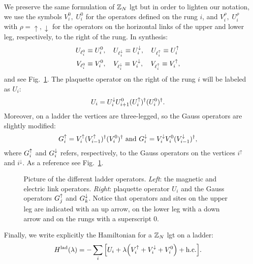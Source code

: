 We preserve the same formulation of $\Z_N$ \ac{lgt} but in order to lighten our notation,
we use the symbols $V^0_i, \; U^0_i$ for the operators defined on the rung $i$, and  $V^{\rho}_i, \; U^{\rho}_i$ with $\rho = \uparrow, \downarrow$ for the operators on the horizontal links of the upper and lower leg, respectively, to the right of the rung.
In synthesis:
\begin{equation}
    \begin{split}
        U_{\ell^0_i} & \equiv U^0_i, \quad
        U_{\ell^\downarrow_i}   \equiv U^{\downarrow}_i, \quad
        U_{\ell^\uparrow_i}   \equiv U^{\uparrow}_i \\
        V_{\ell^0_i} & \equiv V^0_i, \quad
        V_{\ell^\downarrow_i}   \equiv V^{\downarrow}_i, \quad
        V_{\ell^\uparrow_i}   \equiv V^{\uparrow}_i,
    \end{split}
\end{equation}
and see Fig.~\ref{fig:ladder_operators}.
The plaquette operator on the right of the rung $i$ will be labeled as $U_i$:
\begin{equation}
    U_i = U^{\downarrow}_i U^0_{i+1} (U^{\uparrow}_i)^{\dagger} (U^0_i)^{\dagger}.
    \label{eq:plaq_op_ladder}
\end{equation}
Moreover, on a ladder the vertices are three-legged, so the Gauss operators are slightly modified:
\begin{equation}
    G^{\uparrow}_i
    = V^{\uparrow}_i ( V^{\uparrow}_{i-1} )^\dagger ( V^0_i )^\dagger \text{~and~}
    G^{\downarrow}_i
    = V^{\downarrow}_i V^0_i ( V^{\downarrow}_{i-1} )^\dagger,
    \label{eq:gauss_law_ladder}
\end{equation}
where $G^{\uparrow}_i$ and $G^{\downarrow}_i$ refers, respectively, to the Gauss operators on the vertices $i^{\uparrow}$ and $i^{\downarrow}$.
As a reference see Fig.~\ref{fig:ladder_operators}.

\begin{figure}
    \centering
    
    \caption[Operators of a $\Z_N$ ladder \ac{lgt}]{%
        Picture of the different ladder operators.
        \emph{Left}: the magnetic and electric link operators.
        \emph{Right}: plaquette operator $U_i$ and the Gauss operators $G^{\uparrow}_j$ and $G^{\downarrow}_k$.
        Notice that operators and sites on the upper leg are indicated with an up arrow, on the lower leg with a down arrow and on the rungs with a superscript $0$.
    }
    \label{fig:ladder_operators}
\end{figure}


Finally, we write explicitly the Hamiltonian for a $\Z_N$ \ac{lgt} on a ladder:
\begin{equation}
    \HamilLadder(\lambda) =
    - \sum_{i} \bqty{ U_i + \lambda \pqty{ \Vup_i + \Vdown_i + V^0_i } + \text{h.c.} }.
    \label{eq:ladder_hamiltonian}
\end{equation}


